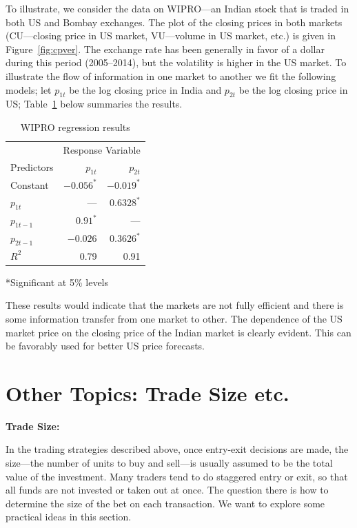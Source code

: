 To illustrate, we consider the data on WIPRO---an Indian stock that is traded in both US and Bombay exchanges. The plot of the closing prices in both markets (CU---closing price in US market, VU---volume in US market, etc.) is given in Figure~\ref{fig:cpver}. The exchange rate has been generally in favor of a dollar during this period (2005--2014), but the volatility is higher in the US market. To illustrate the flow of information in one market to another we fit the following models; let $p_{1t}$ be the log closing price in India and $p_{2t}$ be the log closing price in US; Table~\ref{tab:regresul} below summaries the results.
	\begin{table}[!ht] 
	\caption{WIPRO regression results \label{tab:regresul}}
	\centering
	\begin{tabular}{l|rr} 
	& \multicolumn{2}{c}{Response Variable} \\ 
	Predictors & $p_{1t}$ & $p_{2t}$ \\ \hline 
	Constant & $-0.056^*$ & $-0.019^*$ \\
	$p_{1t}$ & ---  & $0.6328^*$ \\
	$p_{1t-1}$ & $0.91^*$ & --- \\
	$p_{2t-1}$ & $-0.026$ & $0.3626^*$ \\ \hline
	$R^2$ & 0.79 & 0.91 
	\end{tabular}
	\hspace{2.3cm}*Significant at 5\% levels
	\end{table}
These results would indicate that the markets are not fully efficient and there is some information transfer from one market to other. The dependence of the US market price on the closing price of the Indian market is clearly evident. This can be favorably used for better US price forecasts. 



\section{Other Topics: Trade Size etc.}

\noindent \textbf{Trade Size:} \twomedskip

In the trading strategies described above, once entry-exit decisions are made, the size---the number of units to buy and sell---is usually assumed to be the total value of the investment. Many traders tend to do staggered entry or exit, so that all funds are not invested or taken out at once. The question there is how to determine the size of the bet on each transaction. We want to explore some practical ideas in this section. 


